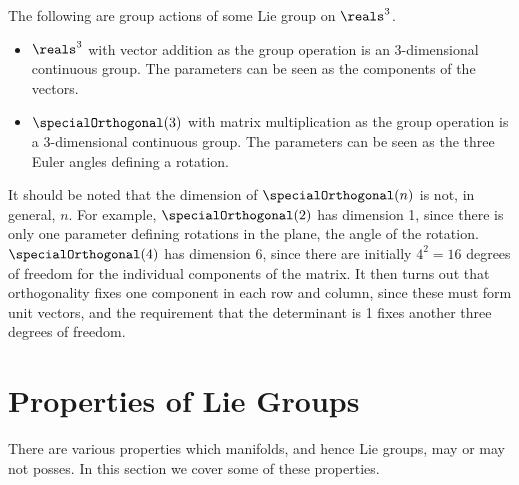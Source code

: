 \documentclass[fleqn]{NotesClass}
\begin{document}
    \begin{exm}{}{}
        The following are group actions of some Lie group on \(\reals^3\).
        \begin{itemize}
            \item \(\reals^3\) with vector addition as the group operation is an \(3\)-dimensional continuous group.
            The parameters can be seen as the components of the vectors.
            
            \item \(\specialOrthogonal(3)\) with matrix multiplication as the group operation is a \(3\)-dimensional continuous group.
            The parameters can be seen as the three Euler angles defining a rotation.
        \end{itemize}
    \end{exm}
    
    It should be noted that the dimension of \(\specialOrthogonal(n)\) is not, in general, \(n\).
    For example, \(\specialOrthogonal(2)\) has dimension 1, since there is only one parameter defining rotations in the plane, the angle of the rotation.
    \(\specialOrthogonal(4)\) has dimension 6, since there are initially \(4^2 = 16\) degrees of freedom for the individual components of the matrix.
    It then turns out that orthogonality fixes one component in each row and column, since these must form unit vectors, and the requirement that the determinant is 1 fixes another three degrees of freedom.
    
    \section{Properties of Lie Groups}
    There are various properties which manifolds, and hence Lie groups, may or may not posses.
    In this section we cover some of these properties.
    
\end{document}
